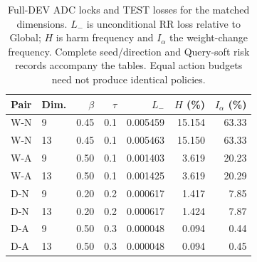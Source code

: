 \begin{table}[htbp]
\centering\footnotesize
\setlength{\tabcolsep}{4pt}
\caption{Full-DEV ADC locks and TEST losses for the matched dimensions. $L_-$ is unconditional RR loss relative to Global; $H$ is harm frequency and $I_\alpha$ the weight-change frequency. Complete seed/direction and Query-soft risk records accompany the tables. Equal action budgets need not produce identical policies.}
\label{tab:dimension-risk}
\begin{tabular}{llrrrrr}
\toprule
Pair & Dim. & $\beta$ & $\tau$ & $L_-$ & $H$ (\%) & $I_\alpha$ (\%)\\
\midrule
W-N & 9 & 0.45 & 0.1 & 0.005459 & 15.154 & 63.33\\
W-N & 13 & 0.45 & 0.1 & 0.005463 & 15.150 & 63.33\\
W-A & 9 & 0.50 & 0.1 & 0.001403 & 3.619 & 20.23\\
W-A & 13 & 0.50 & 0.1 & 0.001425 & 3.619 & 20.29\\
D-N & 9 & 0.20 & 0.2 & 0.000617 & 1.417 & 7.85\\
D-N & 13 & 0.20 & 0.2 & 0.000617 & 1.424 & 7.87\\
D-A & 9 & 0.50 & 0.3 & 0.000048 & 0.094 & 0.44\\
D-A & 13 & 0.50 & 0.3 & 0.000048 & 0.094 & 0.45\\
\bottomrule
\end{tabular}
\end{table}

